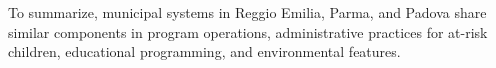 				
To summarize, municipal systems in Reggio Emilia, Parma, and Padova share similar components in program operations, administrative practices for at-risk children, educational programming, and environmental features. 

